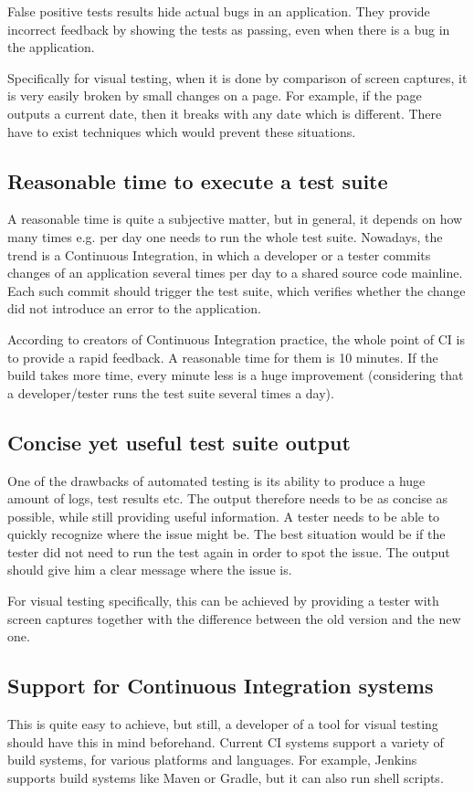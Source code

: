 \documentclass[11pt,oneside,final]{fithesis2}
\begin{document}
    False positive tests results hide actual bugs in an application. They provide incorrect feedback by showing the tests as passing, even when there is a bug in the application.
    
    Specifically for visual testing, when it is done by comparison of screen captures, it is very easily broken by small changes on a page. For example, if the page outputs a current
    date, then it breaks with any date which is different. There have to exist techniques which would prevent these situations.
    
    \subsection{Reasonable time to execute a test suite}
    A reasonable time is quite a subjective matter, but in general, it depends on how many times e.g. per day one needs to run the whole test suite. Nowadays, the trend is a Continuous Integration,
    in which a developer or a tester commits changes of an application several times per day to a shared source code mainline. Each such commit should trigger the test suite, which verifies 
    whether the change did not introduce an error to the application.
    
    According to creators of Continuous Integration practice, the whole point of CI is to provide a rapid feedback. A reasonable time for them is 10 minutes. If the build
    takes more time, every minute less is a huge improvement (considering that a developer/tester runs the test suite several times a day).
    
    \subsection{Concise yet useful test suite output}
    One of the drawbacks of automated testing is its ability to produce a huge amount of logs, test results etc. The output therefore needs to be as concise as possible, while still providing
    useful information. A tester needs to be able to quickly recognize where the issue might be. The best situation would be if the tester did not need to run the test again in order
    to spot the issue. The output should give him a clear message where the issue is.
    
    For visual testing specifically, this can be achieved by providing a tester with screen captures together with the difference between the old version and the new one.
    
    \subsection{Support for Continuous Integration systems}
    This is quite easy to achieve, but still, a developer of a tool for visual testing should have this in mind beforehand. Current CI systems support a variety of build systems, for
    various platforms and languages. For example, Jenkins supports build systems like Maven or Gradle, but it can also run shell scripts.
    
\end{document}
